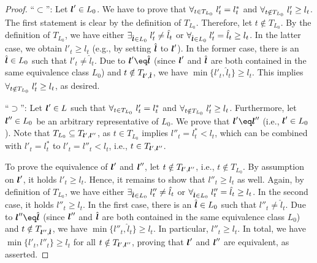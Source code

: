 \begin{proof}
  ``$\subset$'':
  Let ${\boldsymbol{l}}' \in L_0$.
  We have to prove that
  $\forall_{t \in T_{L_0}}\;l'_t = l^\ast_t$ and
  $\forall_{t \notin T_{L_0}}\;l'_t \ge l_t$.
  The first statement is clear by the definition of $T_{L_0}$.
  Therefore, let $t \notin T_{L_0}$.
  By the definition of $T_{L_0}$,
  we have either
  $\exists_{\hat{{\boldsymbol{l}}} \in L_0}\;l'_t \not= \hat{l}_t$ or
  $\forall_{\hat{{\boldsymbol{l}}} \in L_0}\;l'_t = \hat{l}_t \ge l_t$.
  In the latter case, we obtain $l'_t \ge l_t$
  (e.g., by setting $\hat{{\boldsymbol{l}}}$ to ${\boldsymbol{l}}'$).
  In the former case, there is an $\hat{{\boldsymbol{l}}} \in L_0$ such that
  $l'_t \not= \hat{l}_t$.
  Due to $\*l' \eq \hat{\*l}$
  (since ${\boldsymbol{l}}'$ and $\hat{{\boldsymbol{l}}}$ are both contained in the same
  equivalence class $L_0$) and $t \notin T_{{\boldsymbol{l}}',\hat{{\boldsymbol{l}}}}$,
  we have $\min\{l'_t, \hat{l}_t\} \ge l_t$.
  This implies $\forall_{t \notin T_{L_0}}\;l'_t \ge l_t$, as desired.
  
  ``$\supset$'':
  Let ${\boldsymbol{l}}' \in L$ such that
  $\forall_{t \in T_{L_0}}\;l'_t = l^\ast_t$ and
  $\forall_{t \notin T_{L_0}}\;l'_t \ge l_t$.
  Furthermore,
  let ${\boldsymbol{l}}'' \in L_0$ be an arbitrary representative of $L_0$.
  We prove that $\*l' \eq \*l''$ (i.e., ${\boldsymbol{l}}' \in L_0$).
  Note that $T_{L_0} \subseteq T_{{\boldsymbol{l}}',{\boldsymbol{l}}''}$,
  as $t \in T_{L_0}$ implies
  $l''_t = l^\ast_t < l_t$, which can be combined with $l'_t = l^\ast_t$
  to $l'_t = l''_t < l_t$, i.e., $t \in T_{{\boldsymbol{l}}',{\boldsymbol{l}}''}$.
  
  To prove the equivalence of ${\boldsymbol{l}}'$ and ${\boldsymbol{l}}''$,
  let $t \notin T_{{\boldsymbol{l}}',{\boldsymbol{l}}''}$,
  i.e., $t \notin T_{L_0}$.
  By assumption on ${\boldsymbol{l}}'$, it holds $l'_t \ge l_t$.
  Hence, it remains to show that $l''_t \ge l_t$ as well.
  Again, by definition of $T_{L_0}$, we have either
  $\exists_{\hat{{\boldsymbol{l}}} \in L_0}\;l''_t \not= \hat{l}_t$ or
  $\forall_{\hat{{\boldsymbol{l}}} \in L_0}\;l''_t = \hat{l}_t \ge l_t$.
  In the second case, it holds $l''_t \ge l_t$.
  In the first case, there is an $\hat{{\boldsymbol{l}}} \in L_0$ such that
  $l''_t \not= \hat{l}_t$.
  Due to $\*l'' \eq \hat{\*l}$
  (since ${\boldsymbol{l}}''$ and $\hat{{\boldsymbol{l}}}$ are both contained in the same
  equivalence class $L_0$) and $t \notin T_{{\boldsymbol{l}}'',\hat{{\boldsymbol{l}}}}$,
  we have $\min\{l''_t, \hat{l}_t\} \ge l_t$.
  In particular, $l''_t \ge l_t$.
  In total, we have $\min\{l'_t, l''_t\} \ge l_t$ for all
  $t \notin T_{{\boldsymbol{l}}',{\boldsymbol{l}}''}$, proving that ${\boldsymbol{l}}'$ and ${\boldsymbol{l}}''$ are equivalent,
  as asserted.
\end{proof}

